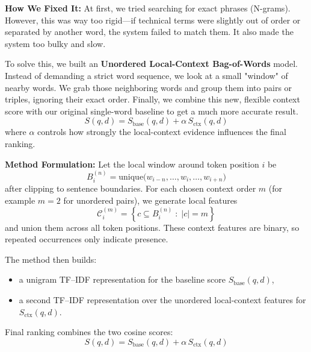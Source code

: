 \documentclass[runningheads]{llncs}
\begin{document}
\textbf{How We Fixed It:}
At first, we tried searching for exact phrases (N-grams). However, this was way too rigid---if technical terms were slightly out of order or separated by another word, the system failed to match them. It also made the system too bulky and slow. 

To solve this, we built an \textbf{Unordered Local-Context Bag-of-Words} model. Instead of demanding a strict word sequence, we look at a small "window" of nearby words. We grab those neighboring words and group them into pairs or triples, ignoring their exact order. Finally, we combine this new, flexible context score with our original single-word baseline to get a much more accurate result.
\begin{equation}
S(q,d) = S_{\text{base}}(q,d) + \alpha \, S_{\text{ctx}}(q,d)
\end{equation}
where $\alpha$ controls how strongly the local-context evidence influences the final ranking.

\textbf{Method Formulation:}
Let the local window around token position $i$ be
\begin{equation}
B_i^{(n)} = \mathrm{unique}\bigl(w_{i-n}, \dots, w_i, \dots, w_{i+n}\bigr)
\end{equation}
after clipping to sentence boundaries. For each chosen context order $m$ (for example $m=2$ for unordered pairs), we generate local features
\begin{equation}
\mathcal{C}_i^{(m)} = \left\{ c \subseteq B_i^{(n)} \;:\; |c| = m \right\}
\end{equation}
and union them across all token positions. These context features are binary, so repeated occurrences only indicate presence.

The method then builds:
\begin{itemize}[noitemsep]
    \item a unigram TF--IDF representation for the baseline score $S_{\text{base}}(q,d)$,
    \item a second TF--IDF representation over the unordered local-context features for $S_{\text{ctx}}(q,d)$.
\end{itemize}

Final ranking combines the two cosine scores:
\begin{equation}
S(q,d) = S_{\text{base}}(q,d) + \alpha \, S_{\text{ctx}}(q,d)
\end{equation}
\end{document}
